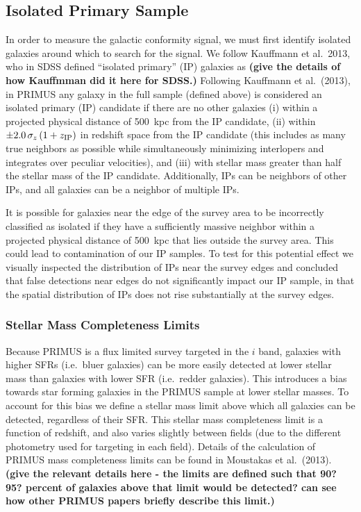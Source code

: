\subsection{Isolated Primary Sample}\label{sec:IPsample}

In order to measure the galactic conformity signal, we must first identify 
isolated galaxies around which to search for the signal.  We follow 
Kauffmann et al.~2013, who in SDSS defined ``isolated primary'' (IP) galaxies
as {\bf(give the details of how Kauffmman did it here for SDSS.)}
Following Kauffmann et al.~(2013), in PRIMUS any galaxy in the full sample 
(defined above) is considered an isolated primary (IP) candidate if there 
are no other galaxies 
(i) within a projected physical distance of 500~kpc from the IP candidate,
(ii) within ${\pm 2.0\,\sigma_{z}\,(1 + z_{\rm IP})}$ in redshift space from 
the IP candidate (this includes as many true neighbors as possible while 
simultaneously minimizing interlopers and integrates over peculiar velocities),
 and
(iii) with stellar mass greater than half the stellar mass of the IP candidate.
Additionally, IPs can be neighbors of other IPs, and all galaxies can be a neighbor of multiple IPs. 

It is possible for galaxies near the edge of the survey area to be incorrectly classified as isolated if they have a sufficiently massive neighbor within a projected physical distance of 500~kpc that lies outside the survey area. This could lead to contamination of our IP samples.
To test for this potential effect we visually inspected the distribution of IPs near the survey edges and concluded that false detections near edges do not significantly impact our IP sample, in that the spatial distribution of IPs does not rise substantially at the survey edges. 


\subsubsection{Stellar Mass Completeness Limits}\label{sec:mass_compare}

Because PRIMUS is a flux limited survey targeted in the $i$ band, galaxies with higher SFRs (i.e.~bluer galaxies) can be more easily detected at lower stellar mass
than galaxies with lower SFR (i.e.~redder galaxies).
This introduces a bias towards star forming galaxies in the PRIMUS sample at 
lower stellar masses.
To account for this bias we define a stellar mass limit above which all galaxies can be detected, regardless of their SFR.
This stellar mass completeness limit is a function of redshift, and also varies slightly between fields (due to the different photometry used for targeting in each field).
Details of the calculation of PRIMUS mass completeness limits can be found in Moustakas et al.~(2013).
{\bf(give the relevant details here - the limits are defined such that 90? 95? percent of galaxies above that limit would be detected?  can see how other PRIMUS papers briefly describe this limit.)}

